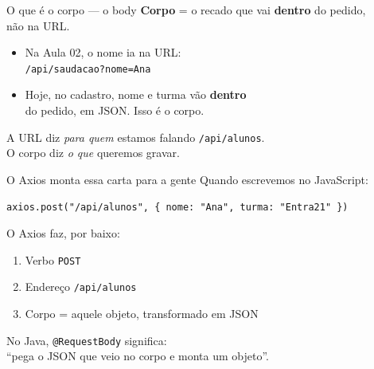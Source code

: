\documentclass[aspectratio=169,11pt]{beamer}
\begin{document}
\begin{frame}{O que é o corpo --- o body}
  \textbf{Corpo} = o recado que vai \textbf{dentro} do pedido,\\
  não na URL.

  \vspace{0.5em}
  \begin{itemize}
    \item Na Aula 02, o nome ia na URL:\\
          \texttt{/api/saudacao?nome=Ana}
    \item Hoje, no cadastro, nome e turma vão \textbf{dentro}\\
          do pedido, em JSON. Isso é o corpo.
  \end{itemize}

  \vspace{0.5em}
  A URL diz \textit{para quem} estamos falando
  \texttt{/api/alunos}.\\
  O corpo diz \textit{o que} queremos gravar.
\end{frame}

\begin{frame}{O Axios monta essa carta para a gente}
  Quando escrevemos no JavaScript:

  \vspace{0.4em}
  \begin{center}
    \texttt{axios.post("/api/alunos", \{ nome: "Ana", turma: "Entra21" \})}
  \end{center}

  \vspace{0.6em}
  O Axios faz, por baixo:
  \begin{enumerate}
    \item Verbo \texttt{POST}
    \item Endereço \texttt{/api/alunos}
    \item Corpo = aquele objeto, transformado em JSON
  \end{enumerate}

  \vspace{0.5em}
  No Java, \texttt{@RequestBody} significa:\\
  ``pega o JSON que veio no corpo e monta um objeto''.
\end{frame}
\end{document}
